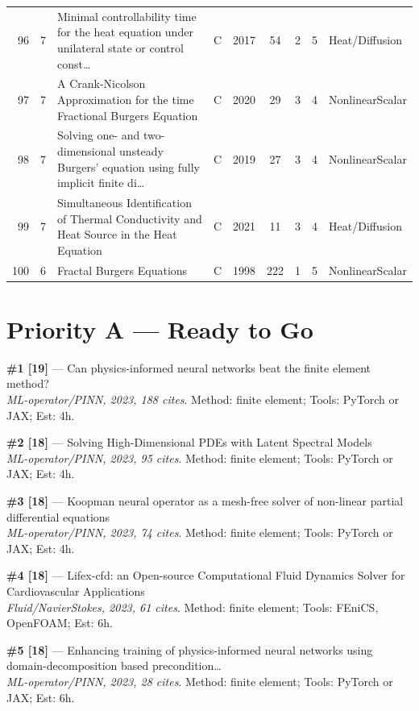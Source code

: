 \documentclass[10pt,letterpaper]{article}
\begin{document}
\begin{center}
\begin{longtable}{rrp{}cccccp{}}
96 & 7 & Minimal controllability time for the heat equation under unilateral state or control const… & C & 2017 & 54 & 2 & 5 & Heat/Diffusion \\
97 & 7 & A Crank-Nicolson Approximation for the time Fractional Burgers Equation & C & 2020 & 29 & 3 & 4 & NonlinearScalar \\
98 & 7 & Solving one- and two-dimensional unsteady Burgers' equation using fully implicit finite di… & C & 2019 & 27 & 3 & 4 & NonlinearScalar \\
99 & 7 & Simultaneous Identification of Thermal Conductivity and Heat Source in the Heat Equation & C & 2021 & 11 & 3 & 4 & Heat/Diffusion \\
100 & 6 & Fractal Burgers Equations & C & 1998 & 222 & 1 & 5 & NonlinearScalar \\
\bottomrule
\end{longtable}
\end{center}

\section{Priority A — Ready to Go}

\textbf{\#1 [19]} — Can physics-informed neural networks beat the finite element method? \\
\textit{ML-operator/PINN, 2023, 188 cites}. Method: finite element; Tools: PyTorch or JAX; Est: 4h.

\textbf{\#2 [18]} — Solving High-Dimensional PDEs with Latent Spectral Models \\
\textit{ML-operator/PINN, 2023, 95 cites}. Method: finite element; Tools: PyTorch or JAX; Est: 4h.

\textbf{\#3 [18]} — Koopman neural operator as a mesh-free solver of non-linear partial differential equations \\
\textit{ML-operator/PINN, 2023, 74 cites}. Method: finite element; Tools: PyTorch or JAX; Est: 4h.

\textbf{\#4 [18]} — Lifex-cfd: an Open-source Computational Fluid Dynamics Solver for Cardiovascular Applications \\
\textit{Fluid/NavierStokes, 2023, 61 cites}. Method: finite element; Tools: FEniCS, OpenFOAM; Est: 6h.

\textbf{\#5 [18]} — Enhancing training of physics-informed neural networks using domain-decomposition based precondition… \\
\textit{ML-operator/PINN, 2023, 28 cites}. Method: finite element; Tools: PyTorch or JAX; Est: 6h.
\end{document}
